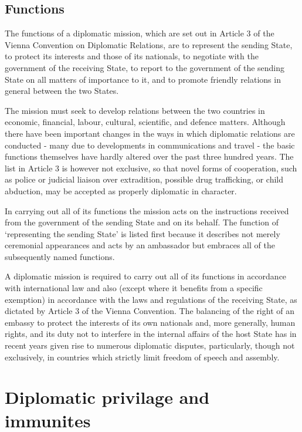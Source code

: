 \documentclass[
  openany]{book}
\begin{document}
\hypertarget{functions}{%
\subsection{Functions}\label{functions}}

The functions of a diplomatic mission, which are set out in Article 3 of the Vienna Convention on Diplomatic Relations, are to represent the sending State, to protect its interests and those of its nationals, to negotiate with the government of the receiving State, to report to the government of the sending State on all matters of importance to it, and to promote friendly relations in general between the two States.

The mission must seek to develop relations between the two countries in economic, financial, labour, cultural, scientific, and defence matters. Although there have been important changes in the ways in which diplomatic relations are conducted - many due to developments in communications and travel - the basic functions themselves have hardly altered over the past three hundred years. The list in Article 3 is however not exclusive, so that novel forms of cooperation, such as police or judicial liaison over extradition, possible drug trafficking, or child abduction, may be accepted as properly diplomatic in character.

In carrying out all of its functions the mission acts on the instructions received from the government of the sending State and on its behalf. The function of `representing the sending State' is listed first because it describes not merely ceremonial appearances and acts by an ambassador but embraces all of the subsequently named functions.

A diplomatic mission is required to carry out all of its functions in accordance with international law and also (except where it benefits from a specific exemption) in accordance with the laws and regulations of the receiving State, as dictated by Article 3 of the Vienna Convention. The balancing of the right of an embassy to protect the interests of its own nationals and, more generally, human rights, and its duty not to interfere in the internal affairs of the host State has in recent years given rise to numerous diplomatic disputes, particularly, though not exclusively, in countries which strictly limit freedom of speech and assembly.

\hypertarget{diplomatic-privilage-and-immunites}{%
\section{Diplomatic privilage and immunites}\label{diplomatic-privilage-and-immunites}}
\end{document}
